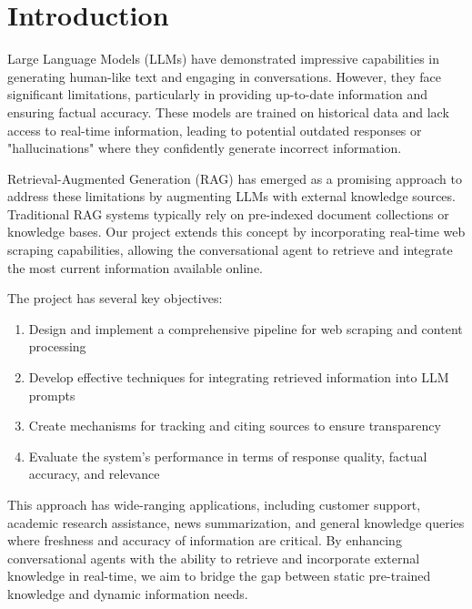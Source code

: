 \documentclass[fleqn,moreauthors,10pt]{ds_report}
\affiliation{\textit{Advisors: Aleš Žagar}}
\begin{document}
\flushbottom 

\maketitle 

\thispagestyle{empty} 


\section*{Introduction}
Large Language Models (LLMs) have demonstrated impressive capabilities in generating human-like text and engaging in conversations. However, they face significant limitations, particularly in providing up-to-date information and ensuring factual accuracy. These models are trained on historical data and lack access to real-time information, leading to potential outdated responses or "hallucinations" where they confidently generate incorrect information.

Retrieval-Augmented Generation (RAG) has emerged as a promising approach to address these limitations by augmenting LLMs with external knowledge sources. Traditional RAG systems typically rely on pre-indexed document collections or knowledge bases. Our project extends this concept by incorporating real-time web scraping capabilities, allowing the conversational agent to retrieve and integrate the most current information available online.

The project has several key objectives:
\begin{enumerate}[noitemsep]
	\item Design and implement a comprehensive pipeline for web scraping and content processing
	\item Develop effective techniques for integrating retrieved information into LLM prompts
	\item Create mechanisms for tracking and citing sources to ensure transparency
	\item Evaluate the system's performance in terms of response quality, factual accuracy, and relevance
\end{enumerate}

This approach has wide-ranging applications, including customer support, academic research assistance, news summarization, and general knowledge queries where freshness and accuracy of information are critical. By enhancing conversational agents with the ability to retrieve and incorporate external knowledge in real-time, we aim to bridge the gap between static pre-trained knowledge and dynamic information needs.
\end{document}
